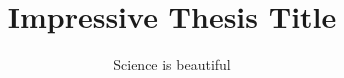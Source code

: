 \documentclass[
  docdegree=phd,        %
  school=nova/fct,      %
  lang=en,              %
  coverlang=pt,         %
  copyrightlang=pt,     %
  fontstyle=kpfonts,    %
  chapstyle=elegant,    %
  otherlistsat=front,   %
  aftercover=false,     %
	linkscolor=darkblue,  %
  printcommittee=true,  %
	spine=false,          %
	biblatex={            %
		backend=bibtex,		  %
		style=numeric-comp, %
		sortcites=true,     %
		sorting=nyt,        %
    maxbibnames=99,			%
		giveninits=true,    %
    hyperref=true       %
	},
	memoir={	            %
    a4paper,            %
    11pt,               %
    final,              %
  },
  media=screen,         %
]{novathesis}
\title{Impressive Thesis Title}
\subtitle{Science is beautiful}
\begin{document}
\thesisfrontmatter	%
\printcoverpage		%
\printaftercover
\printcopyright		%
\printdedicatory	%
\printacknowledgements	%
\printquote		%
\printabstract		%
\tableofcontents* 	%
\printotherlists 	%


\thesismainmatter	%
\printchapthers		%
\printbib		%
\printotherlists 	%
\printappendixes	%
\printannexes	%
\printbackcoverpage
\end{document}
